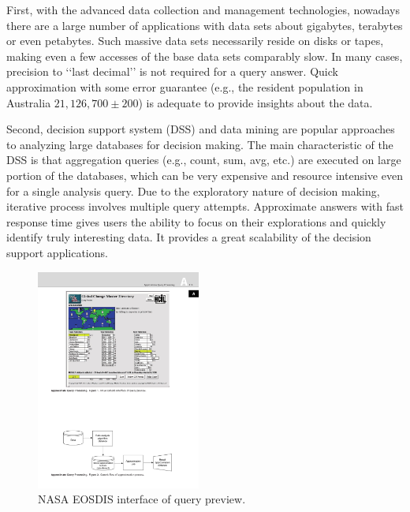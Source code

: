 \documentclass[twocolumn]{article}
\begin{document}
First, with the advanced data collection and management technologies, nowadays there are a large number of applications with data sets about gigabytes, terabytes or even petabytes. Such massive data sets necessarily reside on disks or tapes, making even a few accesses of the base data sets comparably slow. 
In many cases, precision to ‘‘last decimal’’ is not required for a query answer. 
Quick approximation with some error guarantee (e.g., the resident population in Australia $21,126,700 \pm 200$) is adequate to provide insights about the data.

Second, decision support system (DSS) and data mining are popular approaches to analyzing large databases for decision making. The main characteristic of the DSS is that aggregation queries (e.g., count, sum, avg, etc.) are executed on large portion of the databases, which can be very expensive and resource intensive even for a single analysis query. Due to the exploratory nature of decision making, iterative process involves multiple query attempts. Approximate answers with fast response time gives users the ability to focus on their explorations and quickly identify truly interesting data. It provides a great scalability of the decision support applications.
\begin{figure}[htb]
        \centering
        \includegraphics[width=0.48\textwidth]{nasa-gui.pdf}
        \caption{NASA EOSDIS interface of query preview.}
        \label{fig:nasa}
\end{figure}
\end{document}
